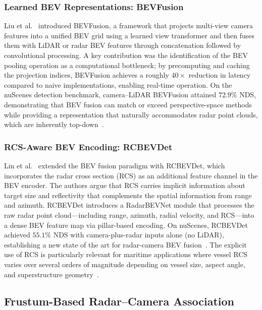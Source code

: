\subsubsection{Learned BEV Representations: BEVFusion}

Liu et al.~\cite{liu2023bevfusion} introduced BEVFusion, a framework that projects multi-view camera features into a unified BEV grid using a learned view transformer and then fuses them with LiDAR or radar BEV features through concatenation followed by convolutional processing. A key contribution was the identification of the BEV pooling operation as a computational bottleneck; by precomputing and caching the projection indices, BEVFusion achieves a roughly $40\times$ reduction in latency compared to naive implementations, enabling real-time operation. On the nuScenes detection benchmark, camera--LiDAR BEVFusion attained $72.9\%$ NDS, demonstrating that BEV fusion can match or exceed perspective-space methods while providing a representation that naturally accommodates radar point clouds, which are inherently top-down~\cite{liu2023bevfusion}.

\subsubsection{RCS-Aware BEV Encoding: RCBEVDet}

Lin et al.~\cite{Lin2024RCBEVDet} extended the BEV fusion paradigm with RCBEVDet, which incorporates the radar cross section (RCS) as an additional feature channel in the BEV encoder. The authors argue that RCS carries implicit information about target size and reflectivity that complements the spatial information from range and azimuth. RCBEVDet introduces a RadarBEVNet module that processes the raw radar point cloud---including range, azimuth, radial velocity, and RCS---into a dense BEV feature map via pillar-based encoding. On nuScenes, RCBEVDet achieved $55.1\%$ NDS with camera-plus-radar inputs alone (no LiDAR), establishing a new state of the art for radar-camera BEV fusion~\cite{Lin2024RCBEVDet}. The explicit use of RCS is particularly relevant for maritime applications where vessel RCS varies over several orders of magnitude depending on vessel size, aspect angle, and superstructure geometry~\cite{Skolnik2008}.

\subsection{Frustum-Based Radar--Camera Association}\label{subsec:frustum}


